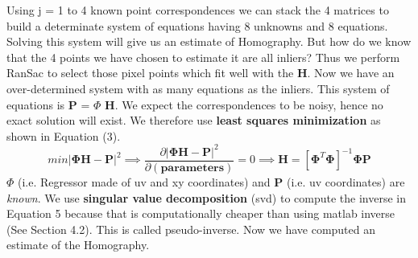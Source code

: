 \documentclass[titlepage]{article}
\begin{document}
Using j = 1 to 4 known point correspondences we can stack the 4 matrices to build a determinate system of equations having 8 unknowns and 8 equations. Solving this system will give us an estimate of Homography. But how do we know that the 4 points we have chosen to estimate it are all inliers? Thus we perform RanSac to select those pixel points which fit well with the \textbf{H}. Now we have an over-determined system with as many equations as the inliers. This system of equations is \textbf{P} =  \textbf{$\Phi$} \textbf{H}. We expect the correspondences to be noisy, hence no exact solution will exist. We therefore use \textbf{least squares minimization} as shown in Equation (3).
\begin{equation}
\label{Least Squares}
min |\mathbf{\Phi} \mathbf{H} - \mathbf{P}|^2 \implies \frac{\partial {|\mathbf{\Phi} \mathbf{H} - \mathbf{P}|^2}}{\partial\mathbf{(parameters)}} = 0 \implies \mathbf{H} = [\mathbf{\Phi}^T \mathbf{\Phi}]^{-1} \mathbf{\Phi} \mathbf{P}
\end{equation}
$\Phi$ (i.e. Regressor made of uv and xy coordinates) and \textbf{P} (i.e. uv coordinates) are \textit{known}. We use \textbf{singular value decomposition} (svd) to compute the inverse in Equation 5 because that is computationally cheaper than using matlab inverse (See Section 4.2). This is called pseudo-inverse. Now we have computed an estimate of the Homography.
\end{document}

